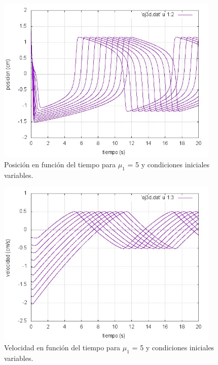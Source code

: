 \documentclass[a4paper,12pt]{article}
\begin{document}
\begin{itemize}
\begin{figure}[H]
\begin{center}
\includegraphics[height=8cm]{grafico_ej3d_xVSt.jpg}
\caption[width=5cm]{Posici\'on en funci\'on del tiempo para $\mu_1$ = 5 y condiciones iniciales variables.}
\end{center}
\end{figure}

\begin{figure}[H]
\begin{center}
\includegraphics[height=8cm]{grafico_ej3d_vVSt.jpg}
\caption[width=5cm]{Velocidad en funci\'on del tiempo para $\mu_1$ = 5 y condiciones iniciales variables.}
\end{center}
\end{figure}


\end{itemize}
\end{document}
